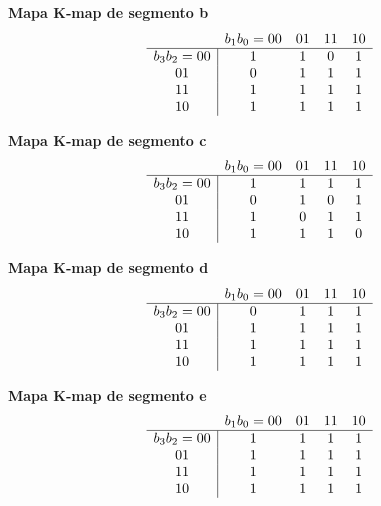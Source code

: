 \documentclass[12pt]{article}
\begin{document}
\noindent
\textbf{Mapa K‐map de segmento \textsf{b}}  
\[
\begin{array}{c|cccc}
\multicolumn{1}{c}{} & \multicolumn{1}{c}{b_1b_0=00} & \multicolumn{1}{c}{01} & \multicolumn{1}{c}{11} & \multicolumn{1}{c}{10} \\
\hline
b_3b_2=00 & 1 & 1 & 0 & 1 \\
01       & 0 & 1 & 1 & 1 \\
11       & 1 & 1 & 1 & 1 \\
10       & 1 & 1 & 1 & 1 \\
\end{array}
\]
\vspace{1em}

\noindent
\textbf{Mapa K‐map de segmento \textsf{c}}  
\[
\begin{array}{c|cccc}
\multicolumn{1}{c}{} & \multicolumn{1}{c}{b_1b_0=00} & \multicolumn{1}{c}{01} & \multicolumn{1}{c}{11} & \multicolumn{1}{c}{10} \\
\hline
b_3b_2=00 & 1 & 1 & 1 & 1 \\
01       & 0 & 1 & 0 & 1 \\
11       & 1 & 0 & 1 & 1 \\
10       & 1 & 1 & 1 & 0 \\
\end{array}
\]
\vspace{1em}

\noindent
\textbf{Mapa K‐map de segmento \textsf{d}}  
\[
\begin{array}{c|cccc}
\multicolumn{1}{c}{} & \multicolumn{1}{c}{b_1b_0=00} & \multicolumn{1}{c}{01} & \multicolumn{1}{c}{11} & \multicolumn{1}{c}{10} \\
\hline
b_3b_2=00 & 0 & 1 & 1 & 1 \\
01       & 1 & 1 & 1 & 1 \\
11       & 1 & 1 & 1 & 1 \\
10       & 1 & 1 & 1 & 1 \\
\end{array}
\]
\vspace{1em}

\noindent
\textbf{Mapa K‐map de segmento \textsf{e}}  
\[
\begin{array}{c|cccc}
\multicolumn{1}{c}{} & \multicolumn{1}{c}{b_1b_0=00} & \multicolumn{1}{c}{01} & \multicolumn{1}{c}{11} & \multicolumn{1}{c}{10} \\
\hline
b_3b_2=00 & 1 & 1 & 1 & 1 \\
01       & 1 & 1 & 1 & 1 \\
11       & 1 & 1 & 1 & 1 \\
10       & 1 & 1 & 1 & 1 \\
\end{array}
\]
\vspace{1em}
\end{document}
